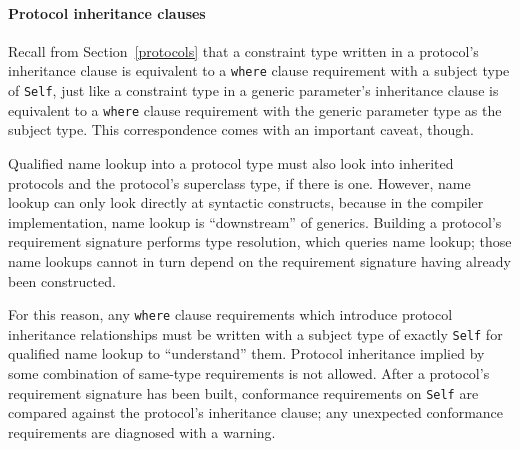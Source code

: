 \documentclass[a4paper,headsepline,bibliography=totoc,toc=flat,fleqn,twoside=semi]{scrbook}
\theoremstyle{definition}
\theoremstyle{definition}
\theoremstyle{definition}
\begin{document}
\paragraph{Protocol inheritance clauses}
Recall from Section~\ref{protocols} that a constraint type written in a protocol's inheritance clause is equivalent to a \texttt{where} clause requirement with a subject type of \texttt{Self}, just like a constraint type in a generic parameter's inheritance clause is equivalent to a \texttt{where} clause requirement with the generic parameter type as the subject type. This correspondence comes with an important caveat, though.

Qualified name lookup into a protocol type must also look into inherited protocols and the protocol's superclass type, if there is one. However, name lookup can only look directly at syntactic constructs, because in the compiler implementation, name lookup is ``downstream'' of generics. Building a protocol's requirement signature performs type resolution, which queries name lookup; those name lookups cannot in turn depend on the requirement signature having already been constructed.

For this reason, any \texttt{where} clause requirements which introduce protocol inheritance relationships must be written with a subject type of exactly \texttt{Self} for qualified name lookup to ``understand'' them. Protocol inheritance implied by some combination of same-type requirements is not allowed. After a protocol's requirement signature has been built, conformance requirements on \texttt{Self} are compared against the protocol's inheritance clause; any unexpected conformance requirements are diagnosed with a warning.
\end{document}
